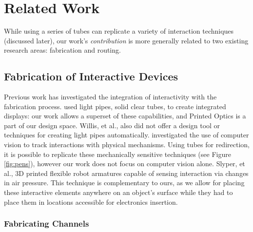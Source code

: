 \section{Related Work}

While using a series of tubes can replicate a variety of interaction techniques (discussed later), our work's \emph{contribution} is more generally related to two existing research areas: fabrication and routing.

\subsection{Fabrication of Interactive Devices}

Previous work has investigated the integration of interactivity with the fabrication process.  \cite{Willis-printedoptics} used light pipes, solid clear tubes, to create integrated displays: our work allows a superset of these capabilities, and Printed Optics is a part of our design space.  Willis, et al., also did not offer a design tool or techniques for creating light pipes automatically.  \cite{Savage-sauron} investigated the use of computer vision to track interactions with physical mechanisms.  Using tubes for redirection, it is possible to replicate these mechanically sensitive techniques (see Figure \ref{fig:pens}), however our work does not focus on computer vision alone.  Slyper, et al., \cite{Slyper-pressure} 3D printed flexible robot armatures capable of sensing interaction via changes in air pressure.  This technique is complementary to ours, as we allow for placing these interactive elements anywhere on an object's surface while they had to place them in locations accessible for electronics insertion.

\subsubsection{Fabricating Channels}

